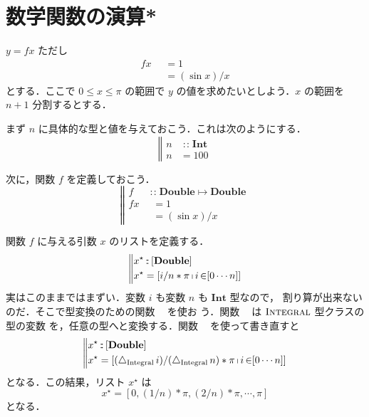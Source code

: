 \documentclass[a5paper,twoside,fleqn,draft]{jsbook}
\newcommand{\mBrace}{\Vert}
\newcommand{\mKeyword}[1]{\mathsf{#1}}
\newcommand{\mOtherwiseKeyword}{\mKeyword{otherwise}}
\DeclareMathOperator{\mOtherwise}{\mOtherwiseKeyword}
\newcommand{\mUpCast}{\bigtriangleup}
\DeclareMathOperator{\mFromIntegral}{\mUpCast_\text{Integral}}
\DeclareMathOperator{\mFrom}{\in}
\DeclareMathOperator{\mFuncArrow}{\mapsto}
\DeclareMathOperator{\mIn}{{:\!:}}
\newcommand{\mType}[1]{\mathbf{#1}} %
\newcommand{\mDoubleType}{\mType{Double}}
\newcommand{\mIntType}{\mType{Int}}
\newcommand{\mTypeClass}[1]{\textsc{#1}} %
\newcommand{\mIntegralTypeClass}{\mTypeClass{Integral}}
\newcommand{\mList}[1]{{#1}^\mathrm{\star}}
\newcommand{\mGuard}[1]{\mathop{\mid_{#1}}}
\DeclareMathOperator{\mListComp}{\shortmid}
\newcommand{\mProjEXP}[2]{#1\mFuncArrow#2} %
\begin{document}
\section{数学関数の演算*}

$y=fx$ ただし
\begin{equation}
\begin{aligned}
fx&\mGuard{x\equiv0}=1\\
&\mGuard{\mOtherwise}=(\sin x)/x
\end{aligned}
\end{equation}
とする．ここで $0\le x\le\pi$ の範囲で $y$ の値を求めたいとしよう．$x$
の範囲を $n+1$ 分割するとする．

まず $n$ に具体的な型と値を与えておこう．これは次のようにする．
\begin{equation}
\left\mBrace
\begin{aligned}
n&\mIn\mIntType\\
n&=100
\end{aligned}
\right.
\end{equation}

次に，関数 $f$ を定義しておこう．
\begin{equation}
\left\mBrace
\begin{aligned}
f&\mIn\mProjEXP{\mDoubleType}{\mDoubleType}\\
fx&\mGuard{x\equiv0}=1\\
&\mGuard{\mOtherwise}=(\sin x)/x
\end{aligned}
\right.
\end{equation}

関数 $f$ に与える引数 $x$ のリストを定義する．
\begin{equation*}
  \left\mBrace
  \begin{aligned}
    \mList{x}
    &\mIn{}[\mDoubleType]\\
    \mList{x}
    &=[i/n*\pi\mListComp i\mFrom[0\dotsb n]]
  \end{aligned}
  \right.
\end{equation*}
実はこのままではまずい．変数 $i$ も変数 $n$ も $\mIntType$ 型なので，
割り算が出来ないのだ．そこで型変換のための関数 $\mFromIntegral$ を使お
う．関数 $\mFromIntegral$ は $\mIntegralTypeClass$ 型クラスの型の変数
を，任意の型へと変換する．関数 $\mFromIntegral$ を使って書き直すと
\begin{equation}
  \left\mBrace
  \begin{aligned}
    \mList{x}
    &\mIn{}[\mDoubleType]\\
    \mList{x}
    &=[(\mFromIntegral i)/(\mFromIntegral n)*\pi\mListComp i\mFrom[0\dotsb n]]
  \end{aligned}
  \right.
\end{equation}
となる．この結果，リスト $\mList{x}$ は
\begin{equation}
  \mList{x}
  =[0,(1/n)*\pi,(2/n)*\pi,\dotsb,\pi]
\end{equation}
となる．
\end{document}
